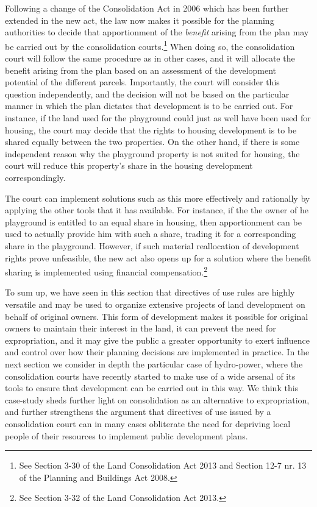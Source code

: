 Following a change of the Consolidation Act in 2006 which has been further extended in the new act, the law now makes it possible for the planning authorities to decide that apportionment of the \emph{benefit} arising from the plan may be carried out by the consolidation courts.\footnote{See Section 3-30 of the Land Consolidation Act 2013 and Section 12-7 nr. 13 of the Planning and Buildings Act 2008.} When doing so, the consolidation court will follow the same procedure as in other cases, and it will allocate the benefit arising from the plan based on an assessment of the development potential of the different parcels. Importantly, the court will consider this question independently, and the decision will not be based on the particular manner in which the plan dictates that development is to be carried out. For instance, if the land used for the playground could just as well have been used for housing, the court may decide that the rights to housing development is to be shared equally between the two properties. On the other hand, if there is some independent reason why the playground property is not suited for housing, the court will reduce this property's share in the housing development correspondingly.

The court can implement solutions such as this more effectively and rationally by applying the other tools that it has available. For instance, if the the owner of he playground is entitled to an equal share in housing, then apportionment can be used to actually provide him with such a share, trading it for a corresponding share in the playground. However, if such material reallocation of development rights prove unfeasible, the new act also opens up for a solution where the benefit sharing is implemented using financial compensation.\footnote{See Section 3-32 of the Land Consolidation Act 2013.}

To sum up, we have seen in this section that directives of use rules are highly versatile and may be used 
to organize extensive projects of land development on behalf of original owners. This form of development makes it possible for original owners to maintain their interest in the land, it can prevent the need for expropriation, and it may give the public a greater opportunity to exert influence and control over how their planning decisions are implemented in practice. In the next section we consider in depth the particular case of hydro-power, where the consolidation courts have recently started to make use of a wide arsenal of its tools to ensure that development can be carried out in this way. We think this case-study sheds further light on consolidation as an alternative to expropriation, and further strengthens the argument that directives of use issued by a consolidation court can in many cases obliterate the need for depriving local people of their resources to implement public development plans.

